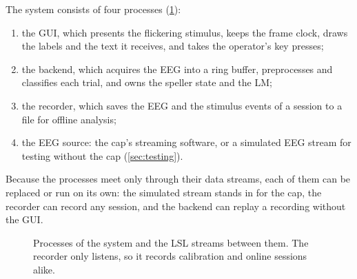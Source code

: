 The system consists of four processes (\cref{fig:architecture}):
\begin{enumerate}
    \item the \ac{GUI}, which presents the flickering stimulus, keeps the frame clock,
      draws the labels and the text it receives, and takes the operator's key presses;
    \item the backend, which acquires the \ac{EEG} into a ring buffer, preprocesses and
      classifies each trial, and owns the speller state and the \ac{LM};
    \item the recorder, which saves the \ac{EEG} and the stimulus events of a session to
      a file for offline analysis;
    \item the \ac{EEG} source: the cap's streaming software, or a simulated \ac{EEG}
      stream for testing without the cap (\cref{sec:testing}).
\end{enumerate}
Because the processes meet only through their data streams, each of them can be
replaced or run on its own: the simulated stream stands in for the cap, the recorder
can record any session, and the backend can replay a recording without the \ac{GUI}.

\begin{figure}[tb]
  \centering
  \caption{Processes of the system and the \acs*{LSL} streams between them. The
    recorder only listens, so it records calibration and online sessions alike.}
  \label{fig:architecture}
\end{figure}

